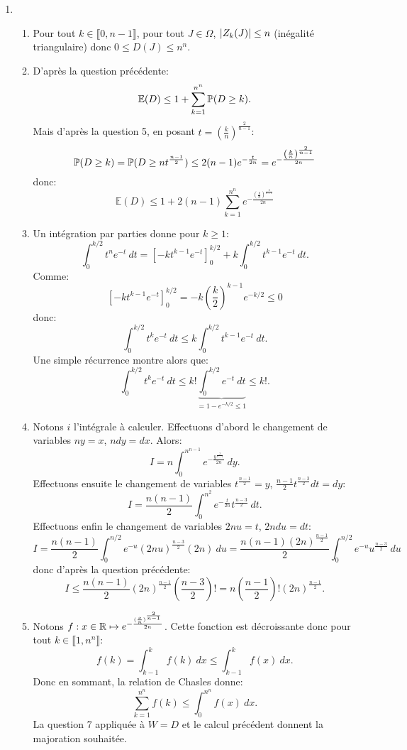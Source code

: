 \begin{enumerate}
\item \begin{enumerate}
           \item Pour tout $k\in \llbracket 0, n-1\rrbracket$, pour tout $J\in \Omega$, $\left\vert Z_{k}(J)\right\vert \leq n$ (inégalité triangulaire) donc $0\leq D(J) \leq n^{n}$.
           \item D'après la question précédente:
           \[ \mathbb{E}(D) \leq 1 + \sum_{k=1}^{n^{n}}\mathbb{P}(D\geq k).\]
           Mais d'après la question 5, en posant $t = \left ( \frac{k}{n}\right )^{\frac{2}{n-1}}$:
           \[ \mathbb{P}(D \geq k) = \mathbb{P}(D \geq nt^{\frac{n-1}{2}}) \leq 2(n-1)e^{-\frac{t}{2n}} = e^{-\frac{\left ( \frac{k}{n}\right )^{\frac{2}{n-1}}}{2n}}\]
           donc:
           \[ \mathbb{E}(D) \leq 1 + 2(n-1)\sum_{k=1}^{n^{n}}e^{-\frac{\left ( \frac{k}{n}\right )^{\frac{2}{n-1}}}{2n}}\]
           \item Un intégration par parties donne pour $k\geq 1$:
           \[ \int_{0}^{k/2}t^{n}e^{-t}\ dt = [-kt^{k-1}e^{-t}]_{0}^{k/2} + k\int_{0}^{k/2}t^{k-1}e^{-t}\ dt.\]
           Comme:
           \[  [-kt^{k-1}e^{-t}]_{0}^{k/2} = -k\left ( \frac{k}{2}\right )^{k-1}e^{-k/2} \leq 0\]
           donc:
           \[ \int_{0}^{k/2}t^{k}e^{-t}\ dt \leq k\int_{0}^{k/2}t^{k-1}e^{-t}\ dt.\]
           Une simple récurrence montre alors que:
           \[ \int_{0}^{k/2}t^{k}e^{-t}\ dt \leq k!\underbrace{\int_{0}^{k/2}e^{-t}\ dt}_{=1 - e^{-k/2} \leq 1} \leq k!.\]
           \item Notons $i$ l'intégrale à calculer. Effectuons d'abord le changement de variables $ny = x$, $ndy = dx$. Alors:
           \[ I = n\int_{0}^{n^{n-1}}e^{-\frac{y^{\frac{2}{n-1}}}{2n}}\ dy.\]
           Effectuons ensuite le changement de variables $t^{\frac{n-1}{2}} = y$, $\frac{n-1}{2}t^{\frac{n-3}{2}}dt = dy$:
           \[ I = \frac{n(n-1)}{2}\int_{0}^{n^{2}}e^{-\frac{t}{2n}}t^{\frac{n-3}{2}}\ dt.\]
           Effectuons enfin le changement de variables $2nu = t$, $2ndu = dt$:
           \[ I = \frac{n(n-1)}{2}\int_{0}^{n/2}e^{-u}(2nu)^{\frac{n-3}{2}}(2n)\ du = \frac{n(n-1)(2n)^{\frac{n-1}{2}}}{2}\int_{0}^{n/2}e^{-u}u^{\frac{n-3}{2}}\ du\]
           donc d'après la question précédente:
           \[ I \leq \frac{n(n-1)}{2}(2n)^{\frac{n-1}{2}}\left ( \frac{n-3}{2}\right )! = n\left ( \frac{n-1}{2}\right )! (2n)^{\frac{n-1}{2}}.\]
           \item Notons $f:x\in \mathbb{R} \mapsto e^{-\frac{(\frac{x}{n}) ^{\frac{2}{n-1}}}{2n}}$. Cette fonction est décroissante donc pour tout $k\in \llbracket 1, n^{n}\rrbracket$:
           \[ f(k) = \int_{k-1}^{k}f(k)\ dx \leq \int_{k-1}^{k}f(x)\ dx.\]
           Donc en sommant, la relation de Chasles donne:
           \[ \sum_{k=1}^{n^{n}}f(k) \leq \int_{0}^{n^{n}}f(x)\ dx.\]
           La question 7 appliquée à $W = D$ et le calcul précédent donnent la majoration souhaitée.

          \end{enumerate}
 

\end{enumerate}


